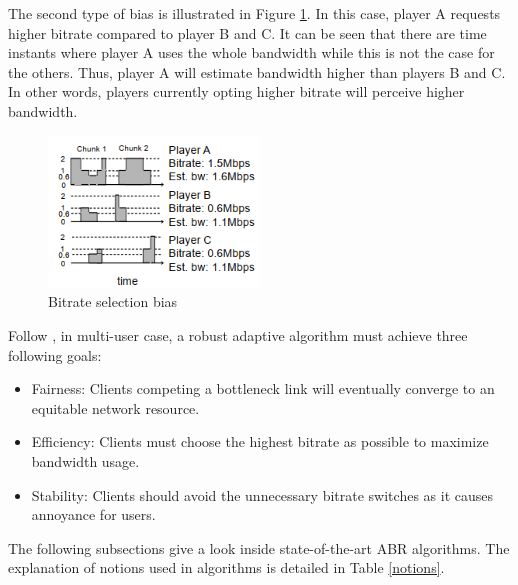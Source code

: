 \documentclass[journal]{IEEEtran}
\begin{document}
\par The second type of bias is illustrated in Figure \ref{bitrate bias}. In this case, player A requests higher bitrate compared to player B and C. It can be seen that there are time instants where player A uses the whole bandwidth while this is not the case for the others. Thus, player A will estimate bandwidth higher than players B and C. In other words, players currently opting higher bitrate will perceive higher bandwidth. 
\begin{figure}[!h]
	\centering
	
	\includegraphics[width=0.5\textwidth]{images/bitrateBias.PNG}
	
	
	
	\caption{Bitrate selection bias}
	\label {bitrate bias}
	
\end{figure} 
\par Follow \cite{PANDA}, in multi-user case, a robust adaptive algorithm must achieve three following goals:
\begin{itemize}
	\item Fairness: Clients competing a bottleneck link will eventually converge to an equitable network resource.  
	\item Efficiency: Clients must choose the highest bitrate as possible to maximize bandwidth usage.
	\item Stability: Clients should avoid the unnecessary bitrate switches as it causes annoyance for users.
\end{itemize}
The following subsections give a look inside state-of-the-art ABR algorithms. The explanation of notions used in algorithms is detailed in Table \ref{notions}.
\end{document}
